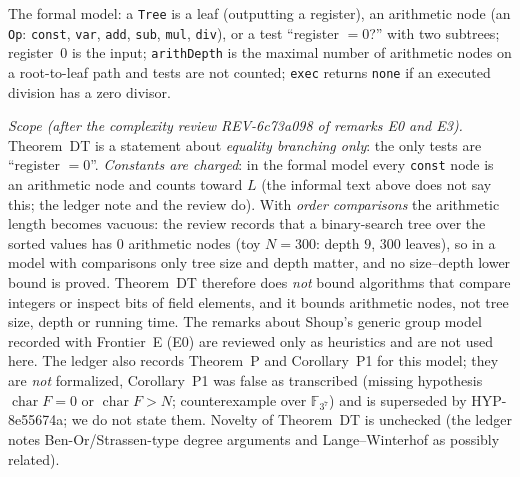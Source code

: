 \documentclass[11pt,a4paper]{article}
\theoremstyle{remark}
\begin{document}
The formal model: a \texttt{Tree} is a leaf (outputting a register), an arithmetic node (an \texttt{Op}: \texttt{const}, \texttt{var}, \texttt{add}, \texttt{sub}, \texttt{mul}, \texttt{div}), or a test ``register $=0$?'' with two subtrees;
register~$0$ is the input; \texttt{arithDepth} is the maximal number of arithmetic nodes on a root-to-leaf path and tests are not counted; \texttt{exec} returns \texttt{none} if an executed division has a zero divisor.

\emph{Scope (after the complexity review \mbox{REV-6c73a098} of remarks E0 and E3).}
Theorem~DT is a statement about \emph{equality branching only}: the only tests are ``register $=0$''. \emph{Constants are charged}: in the formal model every \texttt{const} node is an arithmetic node and counts toward $L$ (the informal text above does not say this; the ledger note and the review do).
With \emph{order comparisons} the arithmetic length becomes vacuous: the review records that a binary-search tree over the sorted values has $0$ arithmetic nodes (toy $N=300$: depth $9$, $300$ leaves), so in a model with comparisons only tree size and depth matter,
and no size--depth lower bound is proved. Theorem~DT therefore does \emph{not} bound algorithms that compare integers or inspect bits of field elements, and it bounds arithmetic nodes, not tree size, depth or running time. The remarks about Shoup's generic group model recorded with Frontier~E (E0) are reviewed only as heuristics and are not used here.
The ledger also records Theorem~P and Corollary~P1 for this model; they are \emph{not} formalized, Corollary~P1 was false as transcribed (missing hypothesis $\operatorname{char}F=0$ or $\operatorname{char}F>N$; counterexample over $\mathbb F_{3^7}$) and is superseded by \mbox{HYP-8e55674a}; we do not state them. Novelty of Theorem~DT is unchecked (the ledger notes Ben-Or/Strassen-type degree arguments and Lange--Winterhof as possibly related).
\end{document}
